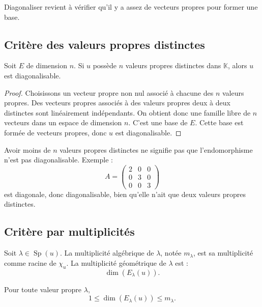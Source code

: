 \documentclass[11pt,a4paper]{article}
\newcommand{\K}{\mathbb K}
\newcommand{\Sp}{\operatorname{Sp}}
\begin{document}
\begin{retenirbox}
Diagonaliser revient à vérifier qu'il y a assez de vecteurs propres pour former une base.
\end{retenirbox}

\subsection{Critère des valeurs propres distinctes}

\begin{theorembox}
Soit \(E\) de dimension \(n\).  
Si \(u\) possède \(n\) valeurs propres distinctes dans \(\K\), alors \(u\) est diagonalisable.
\end{theorembox}

\begin{proof}
Choisissons un vecteur propre non nul associé à chacune des \(n\) valeurs propres.  
Des vecteurs propres associés à des valeurs propres deux à deux distinctes sont linéairement indépendants.  
On obtient donc une famille libre de \(n\) vecteurs dans un espace de dimension \(n\).  
C'est une base de \(E\).  
Cette base est formée de vecteurs propres, donc \(u\) est diagonalisable.
\end{proof}

\begin{erreurbox}
Avoir moins de \(n\) valeurs propres distinctes ne signifie pas que l'endomorphisme n'est pas diagonalisable.  
Exemple :
\[
A=
\begin{pmatrix}
2&0&0\\
0&3&0\\
0&0&3
\end{pmatrix}
\]
est diagonale, donc diagonalisable, bien qu'elle n'ait que deux valeurs propres distinctes.
\end{erreurbox}

\subsection{Critère par multiplicités}

\begin{definitionbox}[Multiplicités]
Soit \(\lambda\in\Sp(u)\).  
La multiplicité algébrique de \(\lambda\), notée \(m_\lambda\), est sa multiplicité comme racine de \(\chi_u\).  
La multiplicité géométrique de \(\lambda\) est :
\[
\dim(E_\lambda(u)).
\]
\end{definitionbox}

\begin{theorembox}
Pour toute valeur propre \(\lambda\),
\[
1\leq \dim(E_\lambda(u))\leq m_\lambda.
\]
\end{theorembox}
\end{document}
